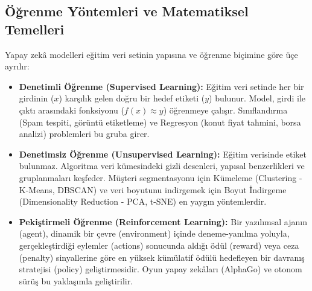 \documentclass[11pt,a4paper,openany]{book}
\begin{document}
\needspace{9cm}
\subsection{Öğrenme Yöntemleri ve Matematiksel Temelleri}
Yapay zekâ modelleri eğitim veri setinin yapısına ve öğrenme biçimine göre üçe ayrılır:
\begin{itemize}
    \item \textbf{Denetimli Öğrenme (Supervised Learning):} Eğitim veri setinde her bir girdinin ($x$) karşılık gelen doğru bir hedef etiketi ($y$) bulunur. Model, girdi ile çıktı arasındaki fonksiyonu ($f(x) \approx y$) öğrenmeye çalışır. Sınıflandırma (Spam tespiti, görüntü etiketleme) ve Regresyon (konut fiyat tahmini, borsa analizi) problemleri bu gruba girer.
    \item \textbf{Denetimsiz Öğrenme (Unsupervised Learning):} Eğitim verisinde etiket bulunmaz. Algoritma veri kümesindeki gizli desenleri, yapısal benzerlikleri ve gruplanmaları keşfeder. Müşteri segmentasyonu için Kümeleme (Clustering - K-Means, DBSCAN) ve veri boyutunu indirgemek için Boyut İndirgeme (Dimensionality Reduction - PCA, t-SNE) en yaygın yöntemlerdir.
    \item \textbf{Pekiştirmeli Öğrenme (Reinforcement Learning):} Bir yazılımsal ajanın (agent), dinamik bir çevre (environment) içinde deneme-yanılma yoluyla, gerçekleştirdiği eylemler (actions) sonucunda aldığı ödül (reward) veya ceza (penalty) sinyallerine göre en yüksek kümülatif ödülü hedefleyen bir davranış stratejisi (policy) geliştirmesidir. Oyun yapay zekâları (AlphaGo) ve otonom sürüş bu yaklaşımla geliştirilir.
\end{itemize}

\needspace{9cm}
\end{document}
